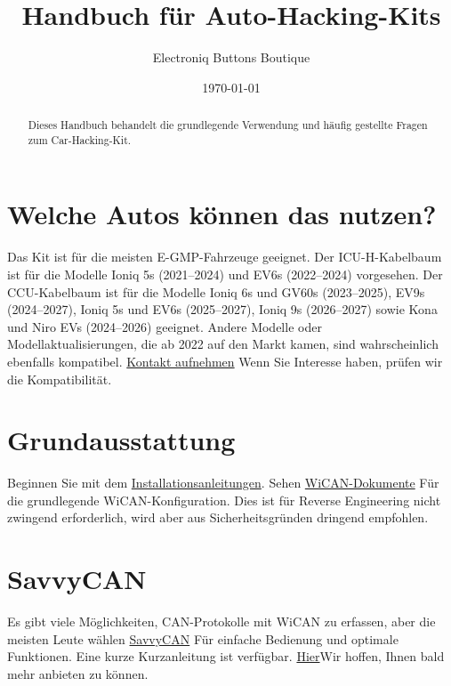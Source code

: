 \documentclass[superscriptaddress,onecolumn,floatfix]{revtex4-2}
\makeatletter
\DeclareRobustCommand{\selectlanguage}[1]{%
    \@ifundefined{alias@\string#1}
      {\ORIGselectlanguage{#1}}
      {\begingroup\edef\x{\endgroup
         \noexpand\ORIGselectlanguage{\@nameuse{alias@#1}}}\x}%
}
\makeatother
\begin{document}
\selectlanguage{de}

\begin{abstract}
  Dieses Handbuch behandelt die grundlegende Verwendung und häufig gestellte Fragen zum Car-Hacking-Kit.
\end{abstract}
\title{Handbuch für Auto-Hacking-Kits}
\author{Electroniq Buttons Boutique}
\date{\today}

\maketitle


\section{Welche Autos können das nutzen?} \label{sect:eligibility}
Das Kit ist für die meisten E-GMP-Fahrzeuge geeignet. Der ICU-H-Kabelbaum ist für die Modelle Ioniq 5s (2021–2024) und EV6s (2022–2024) vorgesehen. Der CCU-Kabelbaum ist für die Modelle Ioniq 6s und GV60s (2023–2025), EV9s (2024–2027), Ioniq 5s und EV6s (2025–2027), Ioniq 9s (2026–2027) sowie Kona und Niro EVs (2024–2026) geeignet. Andere Modelle oder Modellaktualisierungen, die ab 2022 auf den Markt kamen, sind wahrscheinlich ebenfalls kompatibel. \href{mailto:requests@electroniqbuttons.com}{Kontakt aufnehmen} Wenn Sie Interesse haben, prüfen wir die Kompatibilität. 

\section{Grundausstattung}
Beginnen Sie mit dem \href{https://github.com/tylerharvey/Ioniq5_CAN/blob/main/guides/}{Installationsanleitungen}. Sehen \href{https://meatpihq.github.io/wican-fw/config/wifi}{WiCAN-Dokumente} Für die grundlegende WiCAN-Konfiguration. Dies ist für Reverse Engineering nicht zwingend erforderlich, wird aber aus Sicherheitsgründen dringend empfohlen.

\section{SavvyCAN}
Es gibt viele Möglichkeiten, CAN-Protokolle mit WiCAN zu erfassen, aber die meisten Leute wählen \href{https://www.savvycan.com/}{SavvyCAN} Für einfache Bedienung und optimale Funktionen. Eine kurze Kurzanleitung ist verfügbar. \href{https://meatpihq.github.io/wican-fw/savvycan/usage}{Hier}Wir hoffen, Ihnen bald mehr anbieten zu können.
\end{document}
